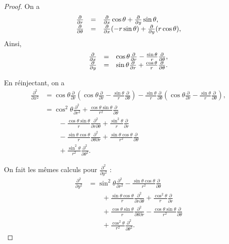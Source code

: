 \documentclass[12pt]{article}
\begin{document}
\begin{proof}
	On a 
	\begin{equation}
		\begin{array}[]{rcl}
			\frac{\partial}{\partial r} &=& \frac{\partial}{\partial x}\cos\theta+\frac{\partial}{\partial y}\sin\theta,\\
			\frac{\partial}{\partial\theta} &=& \frac{\partial}{\partial x}(-r\sin\theta)+\frac{\partial}{\partial y}(r\cos\theta),
		\end{array}
	\end{equation}
	Ainsi,
	\begin{equation}
		\begin{array}[]{rcl}
			\frac{\partial}{\partial x}&=&\cos\theta\frac{\partial}{\partial r}-\frac{\sin\theta}{r}\frac{\partial}{\partial\theta},\\
			\frac{\partial}{\partial y}&=&\sin\theta\frac{\partial}{\partial r}+\frac{\cos\theta}{r}\frac{\partial}{\partial\theta}.
		\end{array}
	\end{equation}

	En réinjectant, on a 
	\begin{align}
		\frac{\partial^{2}}{\partial x^{2}}
		&=\cos\theta\frac{\partial}{\partial r}\left(\cos\theta\frac{\partial}{\partial r}-\frac{\sin\theta}{r}\frac{\partial}{\partial\theta}\right)-\frac{\sin\theta}{r}\frac{\partial}{\partial\theta}\left(\cos\theta\frac{\partial}{\partial r}-\frac{\sin\theta}{r}\frac{\partial}{\partial\theta}\right),\\
		&=\cos^{2}\theta\frac{\partial^{2}}{\partial r^{2}}+\frac{\cos\theta\sin\theta}{r^{2}}\frac{\partial}{\partial\theta}\\
		&\qquad-\frac{\cos\theta\sin\theta}{r}\frac{\partial^{2}}{\partial r\partial\theta}+\frac{\sin^{2}\theta}{r}\frac{\partial}{\partial r}\\
		&\qquad-\frac{\sin\theta\cos\theta}{r}\frac{\partial^{2}}{\partial\theta\partial r}+\frac{\sin\theta\cos\theta}{r^{2}}\frac{\partial}{\partial\theta}\\
		&\qquad+\frac{\sin^{2}\theta}{r^{2}}\frac{\partial^{2}}{\partial\theta^{2}}.
	\end{align}

	On fait les mêmes calculs pour $\frac{\partial^{2}}{\partial y^{2}}$ :
	\begin{align}
		\frac{\partial^{2}}{\partial y^{2}}
		&=\sin^{2}\theta\frac{\partial^{2}}{\partial r^{2}}-\frac{\sin\theta\cos\theta}{r^{2}}\frac{\partial}{\partial\theta}\\
		&\qquad +\frac{\sin\theta\cos\theta}{r}\frac{\partial^{2}}{\partial r\partial\theta}+\frac{\cos^{2}\theta}{r}\frac{\partial}{\partial r}\\
		&\qquad +\frac{\cos\theta\sin\theta}{r}\frac{\partial^{2}}{\partial\theta\partial r}-\frac{\cos\theta\sin\theta}{r^{2}}\frac{\partial}{\partial\theta}\\
		&\qquad +\frac{\cos^{2}\theta}{r^{2}}\frac{\partial^{2}}{\partial\theta^{2}}.
	\end{align}


\end{proof}
\end{document}
